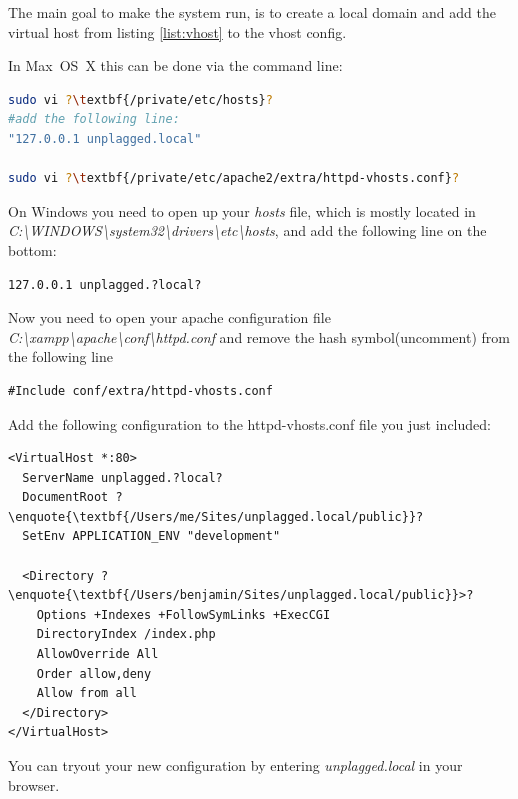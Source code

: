 The main goal to make the system run, is to create a local domain and add the virtual host from listing \ref{list:vhost} 
to the vhost config. 

In Max~OS~X this can be done via 
the command line: 

\begin{lstlisting}[caption=Mac OS X: Creating virtual host, language=bash]
sudo vi ?\textbf{/private/etc/hosts}?
#add the following line:
"127.0.0.1 unplagged.local"

sudo vi ?\textbf{/private/etc/apache2/extra/httpd-vhosts.conf}?
\end{lstlisting}

On Windows you need to open up your \textit{hosts} file, which is mostly located in \\
\textit{C:\textbackslash WINDOWS\textbackslash system32\textbackslash drivers\textbackslash etc\textbackslash hosts}, 
and add the following line on the bottom:

\begin{lstlisting}[caption=New host declaration]
127.0.0.1 unplagged.?local?
\end{lstlisting}

Now you need to open your apache configuration file 
\textit{C:\textbackslash xampp\textbackslash apache\textbackslash conf\textbackslash httpd.conf} and 
remove the hash symbol(uncomment) from the following line

\begin{lstlisting}[caption=httpd.conf]
#Include conf/extra/httpd-vhosts.conf
\end{lstlisting}

Add the following configuration to the httpd-vhosts.conf file you just included:

\begin{lstlisting}[caption=Apache configuration, label=list:vhost]
<VirtualHost *:80>
  ServerName unplagged.?local?
  DocumentRoot ?\enquote{\textbf{/Users/me/Sites/unplagged.local/public}}? 
  SetEnv APPLICATION_ENV "development" 
  
  <Directory ?\enquote{\textbf{/Users/benjamin/Sites/unplagged.local/public}}>?
    Options +Indexes +FollowSymLinks +ExecCGI
    DirectoryIndex /index.php
    AllowOverride All
    Order allow,deny
    Allow from all
  </Directory>
</VirtualHost>
\end{lstlisting}

You can tryout your new configuration by entering \textit{unplagged.local} in your browser.

